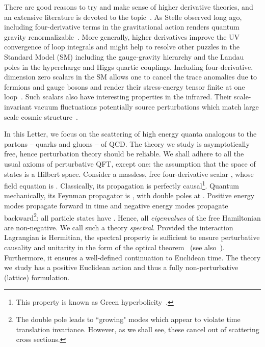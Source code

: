\documentclass[pra,aps,amsmath,amssymb,notitlepage, twocolumn,superscriptaddress,longbibliography,nofootinbib,floatfix,10pt]{revtex4-2}
\makeatletter
\newcounter{mathrecordid}
\newcommand{\mathboxbegin}[1]{%
  \stepcounter{mathrecordid}%
  \immediate\write\mathrecords{\themathrecordid,#1}%
  \special{pdf:bann << /Type /Annot /Subtype /Link /Border [0 0 0]
    /MathBoxID \themathrecordid /F 2
    /A << /S /URI /URI (urn:mathbox:\themathrecordid) >> >>}}
\newcommand{\mathboxinlineplain}[1]{$#1$}
\newcommand{\mathboxinline}[1]{%
  $\mathboxbegin{inline}#1\special{pdf:eann}$}
\newcommand{\recordmath}{%
  \ifmeasuring@\expandafter\mathboxinlineplain
  \else\expandafter\mathboxinline\fi}
\makeatother
\begin{document}
There are good reasons to try and make sense of higher derivative theories, and an extensive literature is devoted to the topic~\cite{Flato:1981iy,*Binegar:1984pb,*binegar1982state,Hawking:2001yt,Rivelles_2003,Bender:2008zz,Mostafazadeh_2010_PU,Mannheim:2011ds,maldacena2011einstein,ErrastiDiez:2024hfq,fring2026spectrumgeneratingalgebraintertwinersresonant}.  As Stelle observed long ago, including four-derivative terms in the gravitational action renders quantum gravity renormalizable~\cite{Stelle:1976gc}. 
More generally, higher derivatives improve the UV convergence of loop integrals and might help to resolve other puzzles in the Standard Model (SM) including the gauge-gravity hierarchy and the Landau poles in the hypercharge and Higgs quartic couplings.  Including four-derivative, dimension zero scalars in the SM allows one to cancel the trace anomalies due to fermions and gauge bosons and render their stress-energy tensor finite at one loop~\cite{Boyle:2021jaz,Boyle:2025bxf}. Such scalars also have interesting properties in the infrared. Their scale-invariant vacuum fluctuations potentially source perturbations which match large scale cosmic structure~\cite{Turok:2023amx}. 

In this Letter, we focus on the scattering of high energy quanta analogous to the partons -- quarks and gluons -- of QCD. The theory we study is asymptotically free, hence perturbation theory should be reliable. We shall adhere to all the usual axioms of perturbative QFT, except one: the assumption that the space of states is a Hilbert space. Consider a massless, free four-derivative scalar \recordmath{\phi}, whose field equation is \recordmath{\square^2 \phi=0}. Classically, its propagation is perfectly causal\footnote{This property is known as  Green hyperbolicity~\cite{bar2015green}.}. Quantum mechanically, its Feynman propagator is \recordmath{-i/(p^2+i \epsilon)^2}, with double poles at \recordmath{p^0=\pm (|\mathbf{p}|-i \epsilon)}. Positive energy modes propagate forward in time and negative energy modes propagate backward\footnote{The double pole leads to ``growing" modes which appear to violate time translation invariance. However, as we shall see, these cancel out of scattering cross sections.}: all particle states have \recordmath{p^0>0}. Hence, all {\it eigenvalues} of the free Hamiltonian are non-negative. We call such a theory {\it spectral}. Provided the interaction Lagrangian is Hermitian, the spectral property is sufficient to ensure perturbative causality and unitarity in the form of the optical theorem~\cite{tHooft:186259} (see also~\cite{BTlong}). Furthermore, it ensures a well-defined continuation to Euclidean time. The theory we study has a positive Euclidean action and thus a fully non-perturbative (lattice) formulation.
\end{document}
